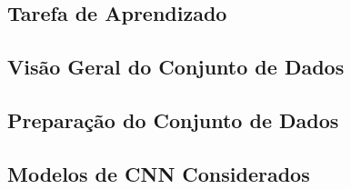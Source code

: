 
\subsection{Tarefa de Aprendizado}

\subsection{Visão Geral do Conjunto de Dados}


\subsection{Preparação do Conjunto de Dados}





\subsection{Modelos de CNN Considerados}

